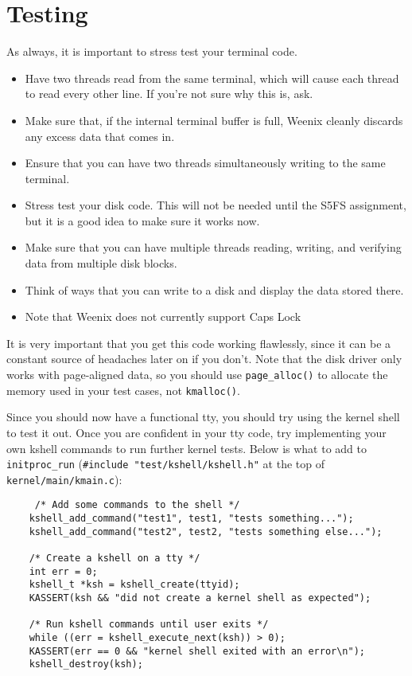 \section{Testing}
As always, it is important to stress test your terminal code.
\begin{itemize}
    \item Have two threads read from the same terminal, which will cause each thread to read every other line. If you're not sure why this is, ask.
    \item Make sure that, if the internal terminal buffer is full, Weenix cleanly discards any excess data that comes in.
    \item Ensure that you can have two threads simultaneously writing to the same terminal.
    \item Stress test your disk code. This will not be needed until the S5FS assignment, but it is a good idea to make sure it works now.
    \item Make sure that you can have multiple threads reading, writing, and verifying data from multiple disk blocks.
    \item Think of ways that you can write to a disk and display the data stored there.
    \item Note that Weenix does not currently support Caps Lock
\end{itemize}
 It is very important that you get this code working flawlessly, since it can be a constant source of headaches later on if you don't. Note that the disk driver only works with page-aligned data, so you should use \texttt{page\_alloc()} to allocate the memory used in your test cases, not \texttt{kmalloc()}.

Since you should now have a functional tty, you should try using the kernel shell to test it out. Once you are confident in your tty code, try implementing your own kshell commands to run further kernel tests. Below is what to add to \texttt{initproc\_run} (\texttt{\#include "test/kshell/kshell.h"} at the top of \texttt{kernel/main/kmain.c}):
\begin{verbatim}
     /* Add some commands to the shell */
    kshell_add_command("test1", test1, "tests something...");
    kshell_add_command("test2", test2, "tests something else...");
 
    /* Create a kshell on a tty */
    int err = 0;
    kshell_t *ksh = kshell_create(ttyid);
    KASSERT(ksh && "did not create a kernel shell as expected");
 
    /* Run kshell commands until user exits */
    while ((err = kshell_execute_next(ksh)) > 0);
    KASSERT(err == 0 && "kernel shell exited with an error\n");
    kshell_destroy(ksh);
\end{verbatim}
